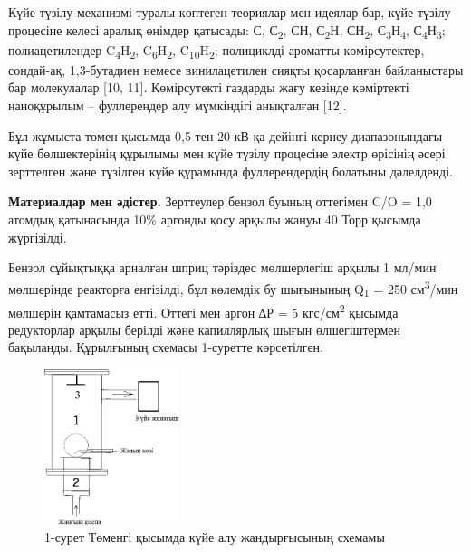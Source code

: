 \begin{multicols}{2}
Күйе түзілу механизмі туралы көптеген теориялар мен идеялар бар, күйе
түзілу процесіне келесі аралық өнімдер қатысады: С, С\textsubscript{2},
СН, С\textsubscript{2}Н, СН\textsubscript{2},
С\textsubscript{3}Н\textsubscript{4},
С\textsubscript{4}Н\textsubscript{3}; полиацетилендер
C\textsubscript{4}H\textsubscript{2},
C\textsubscript{6}H\textsubscript{2},
C\textsubscript{10}H\textsubscript{2}; полициклді ароматты
көмірсутектер, сондай-ақ, 1,3-бутадиен немесе винилацетилен сияқты
қосарланған байланыстары бар молекулалар {[}10, 11{]}. Көмірсутекті
газдарды жағу кезінде көміртекті наноқұрылым -- фуллерендер алу
мүмкіндігі анықталған {[}12{]}.

Бұл жұмыста төмен қысымда 0,5-тен 20 кВ-қа дейінгі кернеу диапазонындағы
күйе бөлшектерінің құрылымы мен күйе түзілу процесіне электр өрісінің
әсері зерттелген және түзілген күйе құрамында фуллерендердің болатыны
дәлелденді.

{\bfseries Материалдар мен әдістер.} Зерттеулер бензол буының оттегімен C/O
= 1,0 атомдық қатынасында 10\% аргонды қосу арқылы жануы 40 Торр қысымда
жүргізілді.

Бензол сұйықтыққа арналған шприц тәріздес мөлшерлегіш арқылы 1 мл/мин
мөлшерінде реакторға енгізілді, бұл көлемдік бу шығынының
Q\textsubscript{1} = 250 см\textsuperscript{3}/мин мөлшерін қамтамасыз
етті. Оттегі мен аргон ∆Р = 5 кгс/см\textsuperscript{2} қысымда
редукторлар арқылы берілді және капиллярлық шығын өлшегіштермен
бақыланды. Құрылғының схемасы 1-суретте көрсетілген.

\begin{figure}[H]
	\centering
	\includegraphics[width=0.35\textwidth]{assets/23}
	\caption*{1-сурет Төменгі қысымда күйе алу жандырғысының схемамы}
\end{figure}


\end{multicols}
